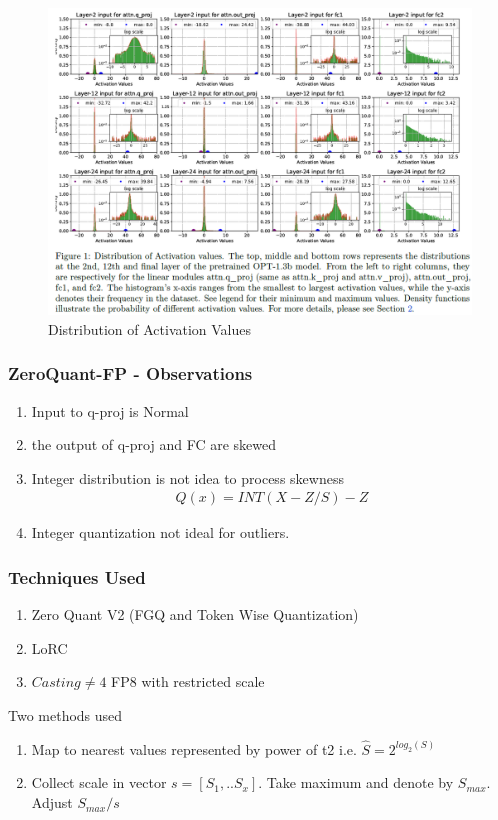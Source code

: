 \documentclass{beamer}
\theoremstyle{plain}
\theoremstyle{definition}
\theoremstyle{remark}
\numberwithin{equation}{section}
\numberwithin{figure}{section}
\numberwithin{theorem}{section}
\begin{document}
\begin{frame}
\begin{figure}
    \centering
    \includegraphics[width=0.9\linewidth]{distribution.png}
    \caption{Distribution of Activation Values}
    \label{fig:distribution-of-activation}
\end{figure}
\end{frame}


\begin{frame}
\frametitle{ZeroQuant-FP - Observations}
\begin{enumerate}
    \item Input to q-proj is Normal
    \item the output of q-proj and FC are skewed
    \item Integer distribution is not idea to process skewness
    \begin{align}
        Q(x) = INT(X- Z/S) - Z
    \end{align}
    \item Integer quantization not ideal for outliers.
\end{enumerate}
\end{frame}

\begin{frame}
\frametitle{Techniques Used}
\begin{enumerate}
    \item Zero Quant V2 (FGQ and Token Wise Quantization)
    \item LoRC
    \item $Casting \neq 4$ FP8 with restricted scale

\end{enumerate}
Two methods used
\begin{enumerate}
    \item Map to nearest values represented by power of t2 i.e. $\hat{S} = 2^{log_2(S)}$
    \item Collect scale in vector $s= [S_1,.. S_x]$. Take maximum and denote by $S_{max}$. Adjust  $S_{max}/s$
\end{enumerate}
\end{frame}
\end{document}
